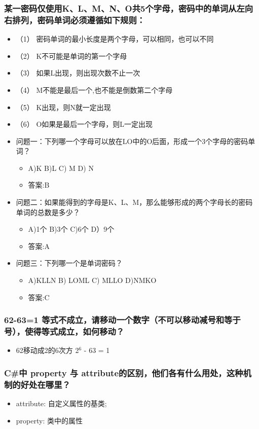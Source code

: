 \documentclass[9pt, b5paper]{article}
\begin{document}
\subsubsection{某一密码仅使用K、L、M、N、O共5个字母，密码中的单词从左向右排列，密码单词必须遵循如下规则：}
\label{sec-1-1-95}
\begin{itemize}
\item （1） 密码单词的最小长度是两个字母，可以相同，也可以不同
\item （2） K不可能是单词的第一个字母
\item （3） 如果L出现，则出现次数不止一次
\item （4） M不能是最后一个,也不能是倒数第二个字母
\item （5） K出现，则N就一定出现
\item （6） O如果是最后一个字母，则L一定出现
\item 问题一：下列哪一个字母可以放在LO中的O后面，形成一个3个字母的密码单词？
\begin{itemize}
\item A)K B)L C) M D) N
\item 答案:B
\end{itemize}
\item 问题二：如果能得到的字母是K、L、M，那么能够形成的两个字母长的密码单词的总数是多少？
\begin{itemize}
\item A)1个 B)3个 C)6个 D）9个
\item 答案:A
\end{itemize}
\item 问题三：下列哪一个是单词密码？
\begin{itemize}
\item A)KLLN B) LOML C) MLLO D)NMKO
\item 答案:C
\end{itemize}
\end{itemize}
\subsubsection{62-63=1 等式不成立，请移动一个数字（不可以移动减号和等于号），使得等式成立，如何移动？}
\label{sec-1-1-96}
\begin{itemize}
\item 62移动成2的6次方 2$^{\text{6}}$ - 63 = 1
\end{itemize}
\subsubsection{C\#中 property 与 attribute的区别，他们各有什么用处，这种机制的好处在哪里？}
\label{sec-1-1-97}
\begin{itemize}
\item attribute: 自定义属性的基类;
\item property: 类中的属性
\end{itemize}
\end{document}
